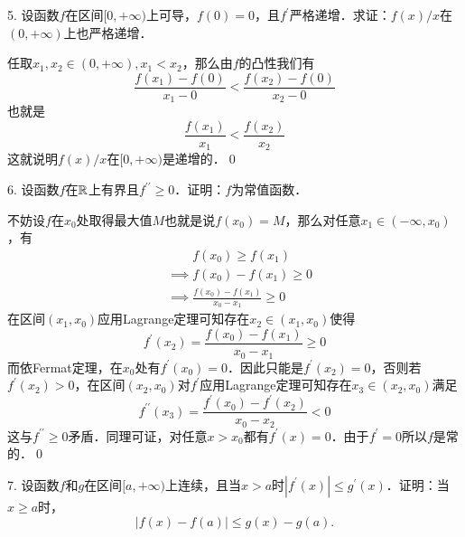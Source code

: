 5. 设函数$f$在区间$[0,+\infty)$上可导，$f(0)=0$，且$f^\prime$严格递增．求证：$f(x)/x$在$(0,+\infty)$上也严格递增．

\prove 任取$x_1, x_2 \in (0, +\infty), x_1 < x_2$，那么由$f$的凸性我们有
\begin{equation}
    \frac{f(x_1)-f(0)}{x_1 - 0} < \frac{f(x_2)-f(0)}{x_2-0}
\end{equation}
也就是
\begin{equation}
    \frac{f(x_1)}{x_1} < \frac{f(x_2)}{x_2}
\end{equation}
这就说明$f(x)/x$在$[0,+\infty)$是递增的．\qed\bigskip

6. 设函数$f$在$\mathbb{R}$上有界且$f^{\prime\prime} \geq 0$．证明：$f$为常值函数．

\prove 不妨设$f$在$x_0$处取得最大值$M$也就是说$f(x_0) = M$，那么对任意$x_1 \in (-\infty, x_0)$，有
\begin{align}
    &\mathrel{\phantom{\implies}} f(x_0) \geq f(x_1) \\
    &\implies f(x_0)-f(x_1) \geq 0 \\
    &\implies \frac{f(x_0)-f(x_1)}{x_0-x_1} \geq 0 
\end{align}
在区间$(x_1,x_0)$应用Lagrange定理可知存在$x_2 \in (x_1,x_0)$使得
\begin{equation}
f^{\prime}(x_2) = \displaystyle\frac{f(x_0)-f(x_1)}{x_0-x_1} \geq 0
\end{equation}
而依Fermat定理，在$x_0$处有$f^{\prime}(x_0) = 0$．因此只能是$f^{\prime}(x_2) = 0$，否则若$f^{\prime}(x_2) > 0$，在区间$(x_2,x_0)$对$f^\prime$应用Lagrange定理可知存在$x_3 \in (x_2,x_0)$满足
\begin{equation}
    f^{\prime\prime}(x_3) = \frac{f^{\prime}(x_0)-f^{\prime}(x_2)}{x_0-x_2} < 0
\end{equation}
这与$f^{\prime\prime} \geq 0$矛盾．同理可证，对任意$x > x_0$都有$f^{\prime}(x) = 0$．由于$f^\prime = 0$所以$f$是常的．\qed\bigskip

7. 设函数$f$和$g$在区间$[a,+\infty)$上连续，且当$x>a$时$\left| f^{\prime}(x) \right| \leq g^{\prime}(x)$．证明：当$x \geq a$时，
\begin{equation*}
    \left| f(x) - f(a) \right| \leq g(x) - g(a).
\end{equation*}

